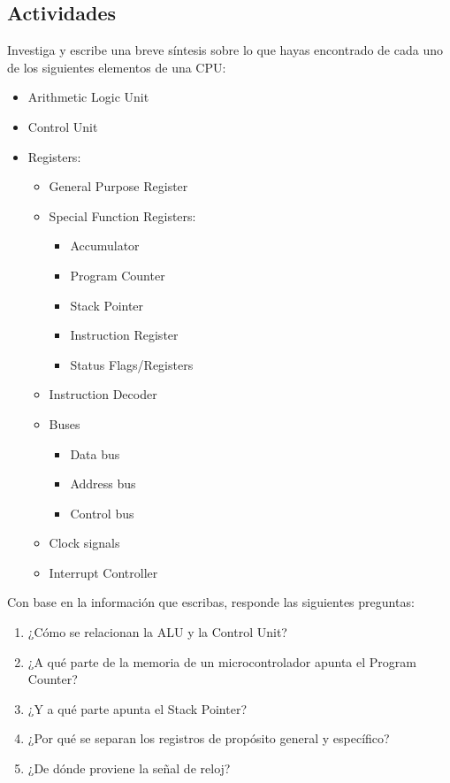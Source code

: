 \documentclass[11pt,letterpaper]{article}
\begin{document}
\subsection*{Actividades}
Investiga y escribe una breve síntesis sobre lo que hayas encontrado de cada uno de los siguientes elementos de una CPU:
\begin{itemize}
    \item Arithmetic Logic Unit
    \item Control Unit
    \item Registers:
    \begin{itemize}
        \item General Purpose Register
        \item Special Function Registers:
        \begin{itemize}
            \item Accumulator
            \item Program Counter
            \item Stack Pointer
            \item Instruction Register
            \item Status Flags/Registers
        \end{itemize}
        \item Instruction Decoder
        \item Buses
        \begin{itemize}
            \item Data bus 
            \item Address bus 
            \item Control bus     
        \end{itemize}
        \item Clock signals
        \item Interrupt Controller
    \end{itemize}
\end{itemize}
Con base en la información que escribas, responde las siguientes preguntas:
\begin{enumerate}
    \item ¿Cómo se relacionan la ALU y la Control Unit?
    \item ¿A qué parte de la memoria de un microcontrolador apunta el Program Counter?
    \item ¿Y a qué parte apunta el Stack Pointer?
    \item ¿Por qué se separan los registros de propósito general y específico?
    \item ¿De dónde proviene la señal de reloj?
\end{enumerate}
\end{document}
